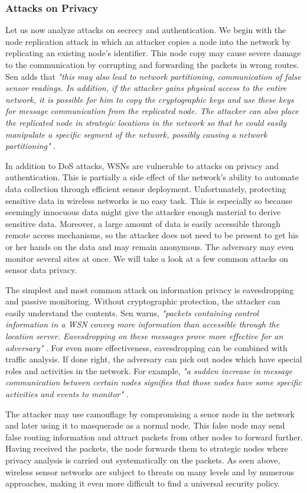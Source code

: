 \documentclass[12pt,a4paper,twoside]{report}
\begin{document}
\subsubsection{Attacks on Privacy}
Let us now analyze attacks on secrecy and authentication. We begin with the node replication attack in which an attacker copies a node into the network by replicating an existing node's identifier. This node copy may cause severe damage to the communication by corrupting and forwarding the packets in wrong routes. Sen adds that \emph{"this may also lead to network partitioning, communication of false sensor readings. In addition, if the attacker gains physical access to the entire network, it is possible for him to copy the cryptographic keys and use these keys for message communication from the replicated node. The attacker can also place the replicated node in strategic locations in the network so that he could easily manipulate a specific segment of the network, possibly causing a network partitioning"} \cite{sen:2009}.\par
In addition to DoS attacks, WSNs are vulnerable to attacks on privacy and authentication. This is partially a side effect of the network's ability to automate data collection through efficient sensor deployment. Unfortunately, protecting sensitive data in wireless networks is no easy task. This is especially so because seemingly innocuous data might give the attacker enough material to derive sensitive data. Moreover, a large amount of data is easily accessible through remote access mechanisms, so the attacker does not need to be present to get his or her hands on the data and may remain anonymous. The adversary may even monitor several sites at once.  We will take a look at a few common attacks on sensor data privacy.\par
The simplest and most common attack on information privacy is eavesdropping and passive monitoring. Without cryptographic protection, the attacker can easily understand the contents. Sen warns, \emph{"packets containing control information in a WSN convey more information than accessible through the location server. Eavesdropping on these messages prove more effective for an adversary"} \cite{sen:2009}. For even more effectiveness, eavesdropping can be combined with traffic analysis. If done right, the adversary can pick out nodes which have special roles and activities in the network. For example, \emph{"a sudden increase in message communication between certain nodes signifies that those nodes have some specific activities and events to monitor"} \cite{sen:2009}. \par
The attacker may use camouflage by compromising a senor node in the network and later using it to masquerade as a normal node. This false node may send false routing information and attract packets from other nodes to forward further. Having received the packets, the node forwards them to strategic nodes where privacy analysis is carried out systematically on the packets. As seen above, wireless sensor networks are subject to threats on many levels and by numerous approaches, making it even more difficult to find a universal security policy.\par
\end{document}

